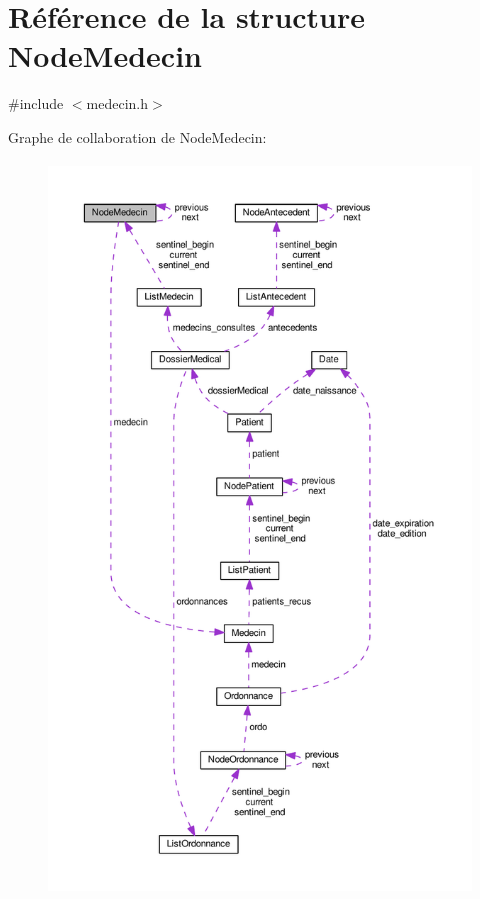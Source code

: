 \hypertarget{struct_node_medecin}{\section{Référence de la structure Node\-Medecin}
\label{struct_node_medecin}
}


{\ttfamily \#include $<$medecin.\-h$>$}



Graphe de collaboration de Node\-Medecin\-:
\nopagebreak
\begin{figure}[H]
\begin{center}
\leavevmode
\includegraphics[height=550pt]{struct_node_medecin__coll__graph}
\end{center}
\end{figure}
